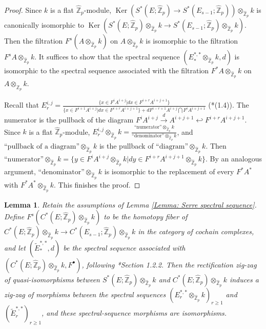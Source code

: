 \documentclass[11pt]{amsart}
\newtheorem{lemma}[theorem]{Lemma}
\theoremstyle{definition}
\numberwithin{equation}{section}
\numberwithin{equation}{section}
\newcommand\ZZ{\mathbb{Z}}
\DeclareMathOperator{\Ker}{Ker}
\begin{document}
\begin{proof}
Since $k$ is a flat $\widehat{\ZZ}_p$-module, $\Ker(S^*(E;\widehat{\ZZ}_p)\rightarrow S^*(E_{s-1};\widehat{\ZZ}_p))\otimes_{\widehat{\ZZ}_p}k$ is canonically isomorphic to $\Ker(S^*(E;\widehat{\ZZ}_p)\otimes_{\widehat{\ZZ}_p}k\rightarrow S^*(E_{s-1};\widehat{\ZZ}_p)\otimes_{\widehat{\ZZ}_p}k)$. Then the filtration $F^s(A\otimes_{\widehat{\ZZ}_p} k)$ on $A\otimes_{\widehat{\ZZ}_p} k$ is isomorphic to the filtration $F^sA \otimes_{\widehat{\ZZ}_p} k$. It suffices to show that the spectral sequence $(E^{*,*}_*\otimes_{\widehat{\ZZ}_p} k,d)$ is isomorphic to the spectral sequence associated with the filtration $F^*A \otimes_{\widehat{\ZZ}_p} k$ on $A \otimes_{\widehat{\ZZ}_p} k$.

Recall that $E^{i,j}_r=\frac{\{x\in F^i A^{i+j}\vert dx\in F^{i+r}A^{i+j+1}\}}{\{x\in F^{i+1}A^{i+j}\vert dx\in F^{i+r}A^{i+j+1}\}+dF^{i-r+1}A^{i+j}\bigcap F^i A^{i+j+1}}$ (\cite{Morgan-hodge-theory}*{(1.4)}). The numerator is the pullback of the diagram $F^i A^{i+j}\xrightarrow{d} A^{i+j+1}\hookleftarrow F^{i+r}A^{i+j+1}$.  Since $k$ is a flat $\widehat{\ZZ}_p$-module, $E^{i,j}_r\otimes_{\widehat{\ZZ}_p}k =\frac{\text{``numerator''}\otimes_{\widehat{\ZZ}_p}k}{\text{``denominator''}\otimes_{\widehat{\ZZ}_p}k}$, and $\text{``pullback of a diagram''}\otimes_{\widehat{\ZZ}_p}k$ is the pullback of $\text{``diagram''}\otimes_{\widehat{\ZZ}_p}k$. Then  $\text{``numerator''}\otimes_{\widehat{\ZZ}_p}k=\{y\in F^i A^{i+j}\otimes_{\widehat{\ZZ}_p}k\vert dy\in F^{i+r}A^{i+j+1}\otimes_{\widehat{\ZZ}_p}k\}$. By an analogous argument, $\text{``denominator''}\otimes_{\widehat{\ZZ}_p}k$ is isomorphic to the replacement of every $F^*A^*$ with $F^*A^*\otimes_{\widehat{\ZZ}_p}k$. This finishes the proof.
\end{proof}

\begin{lemma}\label{Lemma: Comparison of spectral sequences for rectification}
Retain the assumptions of Lemma \ref{Lemma: Serre spectral sequence}.  Define $F^s(C^*(E;\widehat{\ZZ}_p)\otimes_{\widehat{\ZZ}_p} k)$ to be the homotopy fiber of $C^*(E;\widehat{\ZZ}_p)\otimes_{\widehat{\ZZ}_p} k\rightarrow C^*(E_{s-1};\widehat{\ZZ}_p)\otimes_{\widehat{\ZZ}_p} k$ in the category of cochain complexes, and let $(\widetilde{E}^{*,*}_*,d)$ be the spectral sequence associated with $(C^*(E;\widehat{\ZZ}_p)\otimes_{\widehat{\ZZ}_p} k,F^\bullet)$, following \cite{Lurie-higher-algebra}*{Section 1.2.2}. Then the rectification zig-zag of quasi-isomorphisms between $S^*(E;\widehat{\ZZ}_p)\otimes_{\widehat{\ZZ}_p} k$ and $C^*(E;\widehat{\ZZ}_p)\otimes_{\widehat{\ZZ}_p}k$ induces a zig-zag of morphisms between the spectral sequences $(E^{*,*}_r\otimes_{\widehat{\ZZ}_p} k)_{r\geq 1}$ and $(\widetilde{E}^{*,*}_r)_{r\geq 1}$, and these spectral-sequence morphisms are isomorphisms.
\end{lemma}
\end{document}

